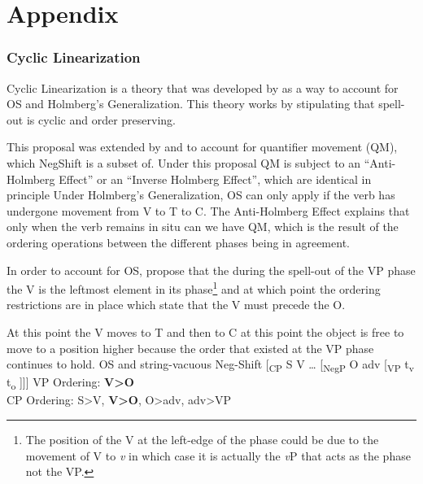 \documentclass[12pt, letterpaper]{article}
\begin{document}

\printbibliography[heading=bibintoc]

\part*{Appendix}

\section*{Cyclic Linearization} \label{sec:CL}

\ea Cyclic Linearization is a theory that was developed by \cite{foxCyclicLinearizationSyntactic2005} as a way to account for OS and Holmberg's Generalization.
\ex This theory works by stipulating that spell-out is cyclic and order preserving. 

\ex This proposal was extended by \citet{foxCyclicLinearizationSyntactic2005} and \citet{engelsMicrovariationObjectPositions2011,engelsScandinavianNegativeIndefinites2012} to account for quantifier movement (QM), which NegShift is a subset of. 
\ex Under this proposal QM is subject to an ``Anti-Holmberg Effect'' or an ``Inverse Holmberg Effect'', which are identical in principle
	\ea Under Holmberg's Generalization, OS can only apply if the verb has undergone movement from V to T to C.
	\ex The Anti-Holmberg Effect explains that only when the verb remains in situ can we have QM, which is the result of the ordering operations between the different phases being in agreement. 
	\z
	\vspace{6pt} 

\ex In order to account for OS, \citeauthor{foxCyclicLinearizationSyntactic2005} propose that the during the spell-out of the VP phase the V is the leftmost element in its phase\footnote{The position of the V at the left-edge of the phase could be due to the movement of V to \textit{v} in which case it is actually the \textit{v}P that acts as the phase not the VP.} and at which point the ordering restrictions are in place which state that the V must precede the O. 

\ex At this point the V moves to T and then to C at this point the object is free to move to a position higher because the order that existed at the VP phase continues to hold. 
\ex OS and string-vacuous Neg-Shift
\vspace{6pt}
 	\ea {}[\textsubscript{CP} S V … [\textsubscript{NegP} O adv [\textsubscript{VP} t\textsubscript{v} t\textsubscript{o} ]]]
	\vspace{6pt}
	\ex VP Ordering: \textbf{V>O}\\
		CP Ordering: S>V, \textbf{V>O}, O>adv, adv>VP
	\z
\end{document}
